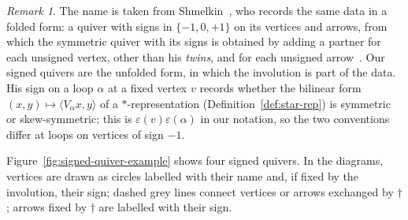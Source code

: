 \documentclass[12pt, a4paper]{report}
\theoremstyle{plain}
\theoremstyle{definition}
\theoremstyle{remark}
\newtheorem{remark}[theorem]{Remark}
\theoremstyle{plain}
\begin{document}
\begin{remark}\label{rem:shmelkin}
The name is taken from Shmelkin~\cite{Shmelkin2006}, who records the same data in a folded form: a quiver with signs in $\{-1,0,+1\}$ on its vertices and arrows, from which the symmetric quiver with its signs is obtained by adding a partner for each unsigned vertex, other than his \emph{twins}, and for each unsigned arrow~\cite[Section~3]{Shmelkin2006}. Our signed quivers are the unfolded form, in which the involution is part of the data. His sign on a loop $\alpha$ at a fixed vertex $v$ records whether the bilinear form $(x,y)\mapsto\langle V_\alpha x,y\rangle$ of a $*$-representation (Definition~\ref{def:star-rep}) is symmetric or skew-symmetric; this is $\varepsilon(v)\varepsilon(\alpha)$ in our notation, so the two conventions differ at loops on vertices of sign $-1$.
\end{remark}

Figure~\ref{fig:signed-quiver-example} shows four signed quivers. In the diagrams, vertices are drawn as circles labelled with their name and, if fixed by the involution, their sign; dashed grey lines connect vertices or arrows exchanged by $\dagger$; arrows fixed by $\dagger$ are labelled with their sign.
\end{document}
